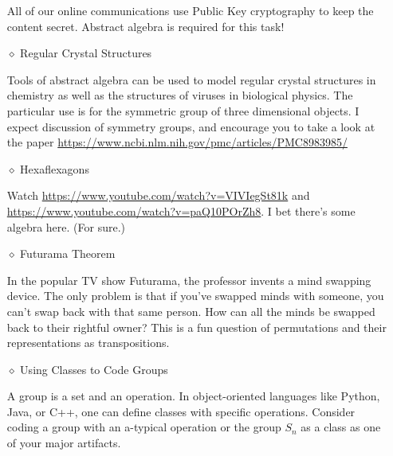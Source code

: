 \documentclass[12pt]{article}
\begin{document}
\begin{itemize}
			All of our online communications use Public Key cryptography to keep the content secret.  Abstract algebra is required for this task!
			
		\item[$\diamond$] Regular Crystal Structures	
		
			Tools of abstract algebra can be used to model regular crystal structures in chemistry as well as the structures of viruses in biological physics.  The particular use is for the symmetric group of three dimensional objects.  I expect discussion of symmetry groups, and encourage you to take a look at the paper \url{https://www.ncbi.nlm.nih.gov/pmc/articles/PMC8983985/}
			
		\item[$\diamond$] Hexaflexagons
		
			Watch \url{https://www.youtube.com/watch?v=VIVIegSt81k} and \url{https://www.youtube.com/watch?v=paQ10POrZh8}. I bet there's some algebra here. (For sure.)
			
		\item[$\diamond$] Futurama Theorem
		
			In the popular TV show Futurama, the professor invents a mind swapping device.  The only problem is that if you've swapped minds with someone, you can't swap back with that same person.  How can all the minds be swapped back to their rightful owner?  This is a fun question of permutations and their representations as transpositions.
			
		
		\item[$\diamond$] Using Classes to Code Groups
		
			A group is a set and an operation.  In object-oriented languages like Python, Java, or C++, one can define classes with specific operations.  Consider coding a group with an a-typical operation or the group $S_n$ as a class as one of your major artifacts.
	\end{itemize}
\end{document}
